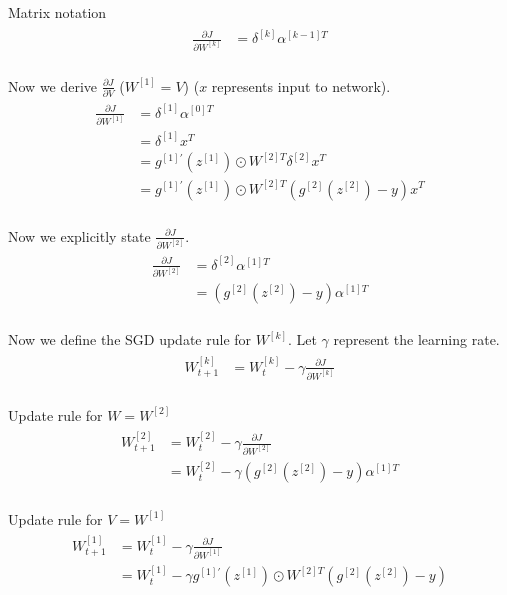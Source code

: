 \documentclass[paper=a4, fontsize=11pt]{scrartcl} %
\numberwithin{equation}{section} %
\numberwithin{figure}{section} %
\numberwithin{table}{section} %
\begin{document}
Matrix notation
\begin{align} 	
\begin{split}
\frac{\partial J}{\partial W^{[k]}}	&= \delta^{[k]}\alpha^{[k-1]T}\\
\end{split}		
\end{align}

Now we derive $\frac{\partial J}{\partial V}$ ($W^{[1]}=V$) ($x$ represents input to network).
\begin{align} 	
\begin{split}
\frac{\partial J}{\partial W^{[1]}}	&= \delta^{[1]}\alpha^{[0]T}\\
&= \delta^{[1]}x^T\\
&= g^{[1]'}(z^{[1]}) \odot W^{[2]T}\delta^{[2]}x^T\\
&= g^{[1]'}(z^{[1]}) \odot W^{[2]T}(g^{[2]}(z^{[2]}) - y)x^T\\
\end{split}		
\end{align}

Now we explicitly state $\frac{\partial J}{\partial W^{[2]}}$.
\begin{align} 	
\begin{split}
\frac{\partial J}{\partial W^{[2]}}	&= \delta^{[2]}\alpha^{[1]T}\\
&= (g^{[2]}(z^{[2]}) - y) \alpha^{[1]T}\\
\end{split}		
\end{align}

Now we define the SGD update rule for $W^{[k]}$. Let $\gamma$ represent the learning rate.
\begin{align} 	
\begin{split}
W^{[k]}_{t+1}	&= W^{[k]}_{t} - \gamma \frac{\partial J}{\partial W^{[k]}}\\
\end{split}		
\end{align}

Update rule for $W = W^{[2]}$
\begin{align} 	
\begin{split}
W^{[2]}_{t+1}	&= W^{[2]}_{t} - \gamma \frac{\partial J}{\partial W^{[2]}}\\
&= W^{[2]}_{t} - \gamma  (g^{[2]}(z^{[2]}) - y) \alpha^{[1]T}\\
\end{split}		
\end{align}

Update rule for $V = W^{[1]}$
\begin{align} 	
\begin{split}
W^{[1]}_{t+1}	&= W^{[1]}_{t} - \gamma \frac{\partial J}{\partial W^{[1]}}\\
&= W^{[1]}_{t} - \gamma  g^{[1]'}(z^{[1]}) \odot W^{[2]T}(g^{[2]}(z^{[2]}) - y)\\
\end{split}		
\end{align}
\end{document}
